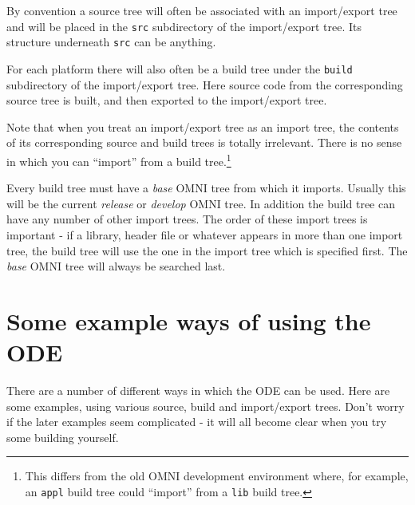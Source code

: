 \documentclass[11pt,twoside,onecolumn]{article}
\begin{document}
By convention a source tree will often be associated with an import/export
tree and will be placed in the {\tt src} subdirectory of the import/export
tree.  Its structure underneath {\tt src} can be anything.

For each platform there will also often be a build tree under the {\tt build}
subdirectory of the import/export tree.  Here source code from the
corresponding source tree is built, and then exported to the import/export
tree.

Note that when you treat an import/export tree as an import tree, the contents
of its corresponding source and build trees is totally irrelevant.  There is no
sense in which you can ``import'' from a build tree.\footnote{This differs from
the old OMNI development environment where, for example, an {\tt appl} build
tree could ``import'' from a {\tt lib} build tree.}

Every build tree must have a {\em base} OMNI tree from which it imports.
Usually this will be the current {\em release} or {\em develop} OMNI tree.  In
addition the build tree can have any number of other import trees.  The order
of these import trees is important - if a library, header file or whatever
appears in more than one import tree, the build tree will use the one in the
import tree which is specified first.  The {\em base} OMNI tree will always be
searched last.


\section{Some example ways of using the ODE}

There are a number of different ways in which the ODE can be used.  Here are
some examples, using various source, build and import/export trees.  Don't
worry if the later examples seem complicated - it will all become clear when
you try some building yourself.
\end{document}
